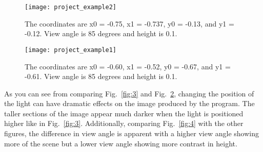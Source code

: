 \documentclass[12pt]{article}
\begin{document}
\begin{figure}[h]
\texttt{[image: project\_example2]}
\vspace{-18bp}
\caption[]{\label{fig:2}\small
The coordinates are x0 = -0.75, x1 = -0.737, y0 = -0.13, and y1 = -0.12.
View angle is 85 degrees and height is 0.1.
}
\end{figure}


\begin{figure}[h]
\texttt{[image: project\_example1]}
\vspace{-18bp}
\caption[]{\label{fig:1}\small
The coordinates are x0 = -0.60, x1 = -0.52, y0 = -0.67, and y1 = -0.61.
View angle is 85 degrees and height is 0.1.
}
\end{figure}

\vspace{10bp}
\indent
As you can see from comparing Fig.~\ref{fig:3} and Fig.~\ref{fig:1}, 
changing the position of the light can have dramatic effects on the 
image produced by the program. The taller sections of the image appear 
much darker when the light is positioned higher like in Fig.~\ref{fig:3}. 
Additionally, comparing Fig.~\ref{fig:4} with the other figures, 
the difference in view angle is apparent with a higher view angle 
showing more of the scene but a lower view angle showing more contrast 
in height.
\end{document}
